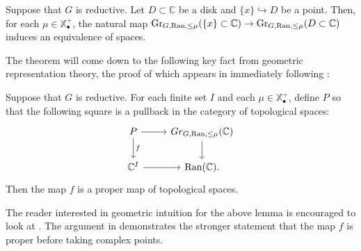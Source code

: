 \begin{prop}\label{prop:diskequiv}
Suppose that $G$ is reductive.  Let $D\subset \mathbb{C}$ be a disk and $\{x \} \hookrightarrow D$ be a point.  Then, for each $\mu\in \mathbb{X}_{\bullet}^+$, the natural map $\operatorname{\mathrm{Gr}}_{G,\operatorname{\mathrm{Ran}}, \leq \mu}(\{x\}\subset \mathbb{C}) \to \operatorname{\mathrm{Gr}}_{G,\operatorname{\mathrm{Ran}}, \leq \mu}(D\subset \mathbb{C})$ induces an equivalence of spaces.

\end{prop}

The theorem will come down to the following key fact from geometric representation theory, the proof of which appears in \cite{BDQuantization} immediately following \cite[5.3.10]{BDQuantization}:

\begin{lem} \label{lem:grproper}
Suppose that $G$ is reductive.  For each finite set $I$ and each $\mu \in \mathbb{X}_{\bullet}^+$, define $P$ so that the following square is a pullback in the category of topological spaces:
$$
\begin{tikzcd}
P \arrow{r} \arrow{d}{f} & Gr_{G,\text{Ran},\le \mu}(\mathbb{C}) \arrow{d} \\
\mathbb{C}^I \arrow{r} & \text{Ran}(\mathbb{C}).
\end{tikzcd}
$$
Then the map $f$ is a proper map of topological spaces.
\end{lem}

\begin{rmk}
The reader interested in geometric intuition for the above lemma is encouraged to look at \cite[Proposition 1.2.4]{ZhuDemazure}.  The argument in \cite{BDQuantization} demonstrates the stronger statement that the map $f$ is proper before taking complex points.
\end{rmk}

\begin{comment}
We also need the following point-set lemma:
\begin{lem}\label{lem:colimproper}
Let $I$ be a finite indexing category and $\{X_i\}_{i\in I}$ be a diagram of topological spaces indexed by $I$.  Let $X = \colim_{i\in I} X_i$ and suppose $f: Y \to X$ is a map of topological spaces with the property that for all $i\in I$, the natural map $f_i: Y\times_X X_i \to X_i$ is proper.  Then the map $f$ is proper.
\end{lem}
\begin{proof}

\end{proof}
\end{comment}

